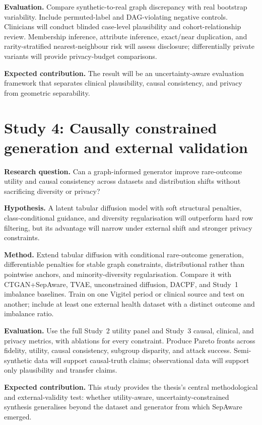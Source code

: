 \textbf{Evaluation.} Compare synthetic-to-real graph discrepancy with real bootstrap variability. Include permuted-label and DAG-violating negative controls. Clinicians will conduct blinded case-level plausibility and cohort-relationship review. Membership inference, attribute inference, exact/near duplication, and rarity-stratified nearest-neighbour risk will assess disclosure; differentially private variants will provide privacy-budget comparisons.

\textbf{Expected contribution.} The result will be an uncertainty-aware evaluation framework that separates clinical plausibility, causal consistency, and privacy from geometric separability.

\section{Study 4: Causally constrained generation and external validation}

\textbf{Research question.} Can a graph-informed generator improve rare-outcome utility and causal consistency across datasets and distribution shifts without sacrificing diversity or privacy?

\textbf{Hypothesis.} A latent tabular diffusion model with soft structural penalties, class-conditional guidance, and diversity regularisation will outperform hard row filtering, but its advantage will narrow under external shift and stronger privacy constraints.

\textbf{Method.} Extend tabular diffusion with conditional rare-outcome generation, differentiable penalties for stable graph constraints, distributional rather than pointwise anchors, and minority-diversity regularisation. Compare it with CTGAN+SepAware, TVAE, unconstrained diffusion, DACPF, and Study~1 imbalance baselines. Train on one Vigitel period or clinical source and test on another; include at least one external health dataset with a distinct outcome and imbalance ratio.

\textbf{Evaluation.} Use the full Study~2 utility panel and Study~3 causal, clinical, and privacy metrics, with ablations for every constraint. Produce Pareto fronts across fidelity, utility, causal consistency, subgroup disparity, and attack success. Semi-synthetic data will support causal-truth claims; observational data will support only plausibility and transfer claims.

\textbf{Expected contribution.} This study provides the thesis's central methodological and external-validity test: whether utility-aware, uncertainty-constrained synthesis generalises beyond the dataset and generator from which SepAware emerged.

